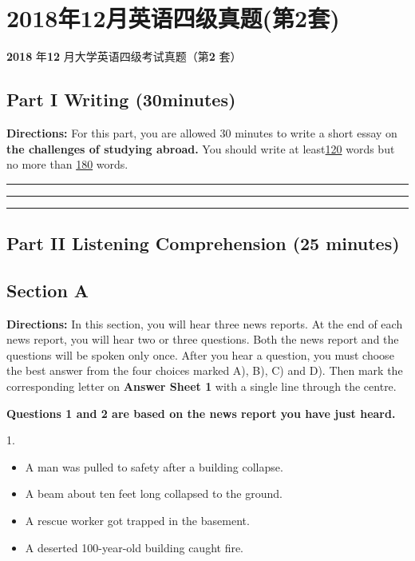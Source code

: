 \documentclass[UTF8,11pt]{ctexart}
\begin{document}
\section*{2018年12月英语四级真题(第2套)}
\textbf{2018} 年\textbf{12} 月大学英语四级考试真题（第\textbf{2} 套）


\subsection*{\textbf{Part I} \textbf{Writing} \textbf{(30minutes)}}


\textbf{Directions:} For this part, you are allowed 30 minutes to write a short essay on\textbf{ the challenges of studying abroad.} You should write at least\uline{120} words but no more than \uline{180} words. \par\noindent\rule{.95\linewidth}{.4pt}\par  \par\noindent\rule{.95\linewidth}{.4pt}\par  \par\noindent\rule{.95\linewidth}{.4pt}\par


\subsection*{\textbf{Part II} \textbf{Listening Comprehension} \textbf{(25 minutes)}}


\subsection*{\textbf{Section A}}


\textbf{Directions:} In this section, you will hear three news reports. At the end of each news report, you will hear two or three questions. Both the news report and the questions will be spoken only once. After you hear a question, you must choose the best answer from the four choices marked A), B), C) and D). Then mark the corresponding letter on\textbf{ Answer Sheet 1} with a single line through the centre.


\textbf{Questions 1 and 2 are based on the news report you have just heard.}


1.


\begin{itemize}[leftmargin=2em,itemsep=.2em,topsep=.4em]\item[A.] A man was pulled to safety after a building collapse.
\item[B.] A beam about ten feet long collapsed to the ground.
\item[C.] A rescue worker got trapped in the basement.
\item[D.] A deserted 100-year-old building caught fire.
\end{itemize}
\end{document}
